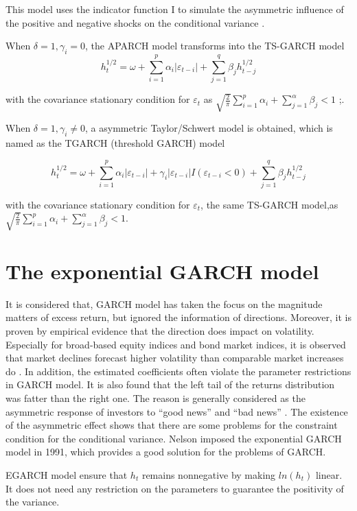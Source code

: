 This model uses the indicator function I to simulate the asymmetric influence of the positive and negative shocks on the conditional variance \citep{Glosten1993}.

When $\delta=1,\gamma_{i}=0$, the APARCH model transforms into the TS-GARCH model
\[h_{t}^{1/2} = \omega + \sum_{i=1}^{p}\alpha_{i}|\varepsilon_{t-i}|+\sum_{j=1}^{q}\beta_{j}h_{t-j}^{1/2}\]

with the covariance stationary condition for  $\varepsilon_{t}$ as  $\sqrt{\frac{2}{\pi}} \sum_{i=1}^{p}\alpha_{i} + \sum_{j=1}^{\alpha}\beta_{j}<1$
\citep{Schwert1990};\citep{stephen1986modelling}.

When $\delta=1,\gamma_{i}\neq0$, a asymmetric Taylor/Schwert model is obtained, which is named as the TGARCH (threshold GARCH) model

\[h_{t}^{1/2} = \omega + \sum_{i=1}^{p}\alpha_{i}|\varepsilon_{t-i}|+\gamma_i|\varepsilon_{t-i}|I(\varepsilon_{t-i}<0)+\sum_{j=1}^{q}\beta_{j}h_{t-j}^{1/2}\]

 with the covariance stationary condition for  $\varepsilon_{t}$, the same TS-GARCH model,as  $\sqrt{\frac{2}{\pi}} \sum_{i=1}^{p}\alpha_{i} + \sum_{j=1}^{\alpha}\beta_{j}<1$\citep{Zakoian1994}.


\section{The exponential GARCH model}

It is considered that, GARCH model has taken the focus on the magnitude matters of excess return, but ignored the information of directions. Moreover, it is proven by empirical evidence that the direction does impact on volatility. Especially for broad-based equity indices and bond market indices, it is observed that market declines forecast higher volatility than comparable market increases do \citep{Engle2001}. In addition, the estimated coefficients often violate the parameter restrictions in GARCH model. It is also found that the left tail of the returns distribution was fatter than the right one. The reason is generally considered as the asymmetric response of investors to “good news” and “bad news” \citep{Jondeau2003}. The existence of the asymmetric effect shows that there are some problems for the constraint condition for the  conditional variance. Nelson imposed the exponential GARCH model in 1991, which provides a good solution for the problems of GARCH. 

EGARCH model ensure that $h_{t}$  remains nonnegative by making $ln(h_{t})$ linear. It does not need any restriction on the parameters to guarantee the positivity of the variance.

